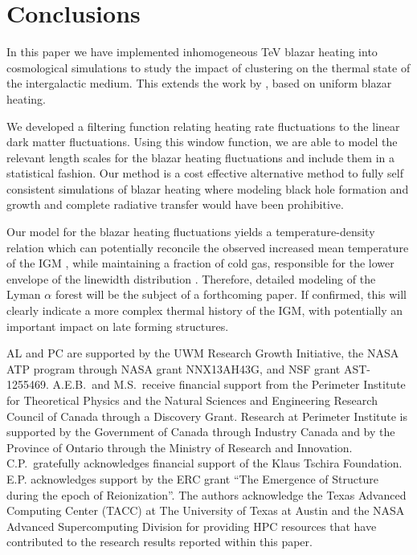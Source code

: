 \documentclass[numberedappendix]{emulateapj}
\begin{document}
\section{Conclusions}
In this paper we have implemented inhomogeneous TeV blazar heating into cosmological simulations to study the impact of clustering on the thermal state of the intergalactic medium. This extends the work by \citet{2012ApJ...752...23C,2012MNRAS.423..149P}, based on uniform blazar heating.

We developed a filtering function relating heating rate fluctuations to the linear dark matter fluctuations. Using this window function, we are able to model the relevant length scales for the blazar heating fluctuations and include them in a statistical fashion. Our method is a cost effective alternative method to fully self consistent simulations of blazar heating where modeling black hole formation and growth and complete radiative transfer would have been prohibitive.

Our model for the blazar heating fluctuations yields a temperature-density relation which can potentially reconcile the observed increased mean temperature of the IGM \citep{2014MNRAS.441.1916B}, while maintaining a fraction of cold gas, responsible for the lower envelope of the linewidth distribution \citep{2012ApJ...757L..30R}. Therefore, detailed modeling of the Lyman $\alpha$ forest will be the subject of a forthcoming paper. If confirmed, this will clearly indicate a more complex thermal history of the IGM, with potentially an important impact on late forming structures.
\begin{acknowledgements}
AL and PC are supported by the UWM Research Growth Initiative, the NASA ATP
program through NASA grant NNX13AH43G, and NSF grant AST-1255469.
A.E.B.~and M.S.~receive financial support from the Perimeter
Institute for Theoretical Physics and the Natural Sciences and
Engineering Research Council of Canada through a Discovery Grant.
Research at Perimeter Institute is supported by the Government of
Canada through Industry Canada and by the Province of Ontario through
the Ministry of Research and Innovation.
C.P.~gratefully acknowledges
financial support of the Klaus Tschira Foundation. E.P. acknowledges support by the ERC grant ``The Emergence of Structure during the epoch of Reionization''.
The authors acknowledge the Texas Advanced Computing Center (TACC) at The University of Texas at Austin and the NASA Advanced Supercomputing Division for providing HPC resources that have contributed to the research results reported within this paper.
\end{acknowledgements}
\end{document}
